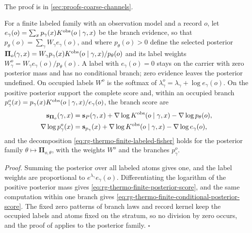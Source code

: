 The proof is in \cref{sec:proofs-coarse-channels}.

\label{def:rg-thermo-finite-posterior}
\label{eq:rg-thermo-finite-evidence}
\label{eq:rg-thermo-finite-posterior}
\label{eq:rg-thermo-finite-posterior-labels}
For a finite labeled family with an observation model and a record $o$, let
$e_\gamma(o)=\sum_xp_\gamma(x)K^{\mathrm{obs}}(o\mid\gamma,x)$ be the branch evidence, so that
$p_\theta(o)=\sum_\gamma W_\gamma e_\gamma(o)$, and where $p_\theta(o)>0$ define the selected
posterior $\boldsymbol\Pi_o(\gamma,x)=W_\gamma p_\gamma(x)K^{\mathrm{obs}}(o\mid\gamma,x)/p_\theta(o)$
and its label weights $W^o_\gamma=W_\gamma e_\gamma(o)/p_\theta(o)$. A label with $e_\gamma(o)=0$
stays on the carrier with zero posterior mass and has no conditional
branch; zero evidence leaves the posterior undefined. On occupied labels $W^o$ is the softmax of
$\lambda^o_\gamma=\lambda_\gamma+\log e_\gamma(o)$. On the positive posterior support the complete
score and, within an occupied branch
$p^o_\gamma(x)=p_\gamma(x)K^{\mathrm{obs}}(o\mid\gamma,x)/e_\gamma(o)$, the branch score are
\begin{align}
\mathbf s_{\boldsymbol\Pi_o}(\gamma,x)
&=\mathbf s_P(\gamma,x)+\nabla\log K^{\mathrm{obs}}(o\mid\gamma,x)-\nabla\log p_\theta(o),
\label{eq:rg-thermo-finite-posterior-score}\\
\nabla\log p^o_\gamma(x)&=\mathbf s_{p_\gamma}(x)+\nabla\log K^{\mathrm{obs}}(o\mid\gamma,x)
-\nabla\log e_\gamma(o),
\label{eq:rg-thermo-finite-conditional-posterior-score}
\end{align}
and the decomposition \eqref{eq:rg-thermo-finite-labeled-fisher} holds for the posterior family
$\theta\mapsto\boldsymbol\Pi_{o,\theta}$, with the weights $W^o$ and the branches $p^o_\gamma$.

\noindent\emph{Proof.}
Summing the posterior over all labeled atoms gives one, and the label weights
are proportional to $e^{\lambda_\gamma}e_\gamma(o)$. Differentiating the logarithm of the positive
posterior mass gives \eqref{eq:rg-thermo-finite-posterior-score}, and the same computation within
one branch gives \eqref{eq:rg-thermo-finite-conditional-posterior-score}. The fixed zero patterns of
branch laws and record kernel keep the occupied labels and atoms fixed on the stratum, so no
division by zero occurs, and the proof of  applies to the
posterior family. $\square$

